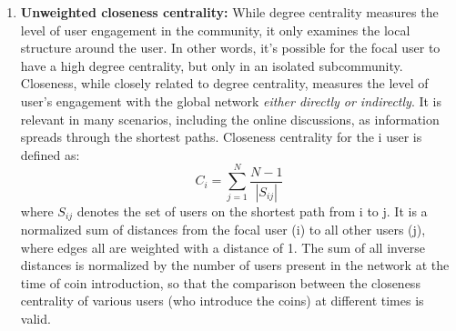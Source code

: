 \begin{enumerate}[topsep=0pt,itemsep=-0.5ex,partopsep=1ex,parsep=1ex]
  \item \textbf{Unweighted closeness centrality:} While degree centrality measures the level of user engagement in the community, it only examines the local structure around the user. In other words, it's possible for the focal user to have a high degree centrality, but only in an isolated subcommunity. Closeness, while closely related to degree centrality, measures the level of user's engagement with the global network \textit{either directly or indirectly}. It is relevant in many scenarios, including the online discussions, as information spreads through the shortest paths. Closeness centrality for the i user is defined as:
  \begin{equation}
    C_{i} = \sum_{j=1}^{N} \frac{N-1}{|S_{ij}|}
  \end{equation}
  where $S_{ij}$ denotes the set of users on the shortest path from i to j. It is a normalized sum of distances from the focal user (i) to all other users (j), where edges all are weighted with a distance of 1. The sum of all inverse distances is normalized by the number of users present in the network at the time of coin introduction, so that the comparison between the closeness centrality of various users (who introduce the coins) at different times  is valid. 
  

\end{enumerate}

